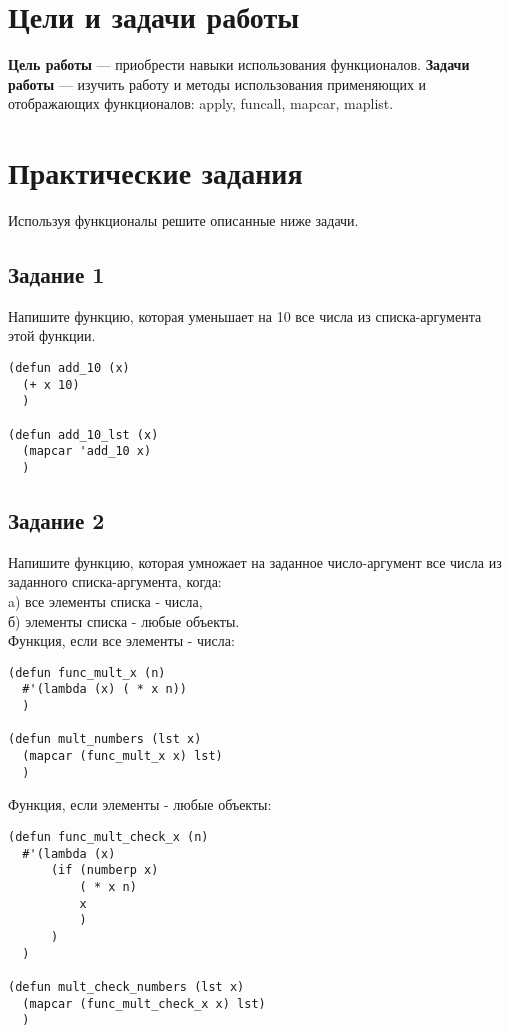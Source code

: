 \chapter{Цели и задачи работы}
\textbf{Цель работы} --- приобрести навыки использования функционалов.
\textbf{Задачи работы} --- изучить работу и методы использования применяющих и отображающих функционалов: apply, funcall, mapcar, maplist.

\chapter{Практические задания}
Используя функционалы решите описанные ниже задачи.
\section{Задание 1}
Напишите функцию, которая уменьшает на 10 все числа из списка-аргумента этой функции.

\begin{lstlisting}
(defun add_10 (x)
  (+ x 10)
  )

(defun add_10_lst (x)
  (mapcar 'add_10 x)
  )
\end{lstlisting}

\section{Задание 2}
Напишите функцию, которая умножает на заданное число-аргумент все числа из заданного списка-аргумента, когда:\\
a) все элементы списка - числа,\\
б) элементы списка - любые объекты.\\

Функция, если все элементы - числа:\\
\begin{lstlisting}
(defun func_mult_x (n)
  #'(lambda (x) ( * x n))
  )

(defun mult_numbers (lst x)
  (mapcar (func_mult_x x) lst)
  )
\end{lstlisting}

Функция, если элементы - любые объекты:\\
\begin{lstlisting}
(defun func_mult_check_x (n)
  #'(lambda (x)
      (if (numberp x)
          ( * x n)
          x
          )
      )
  )

(defun mult_check_numbers (lst x)
  (mapcar (func_mult_check_x x) lst)
  )
\end{lstlisting}



